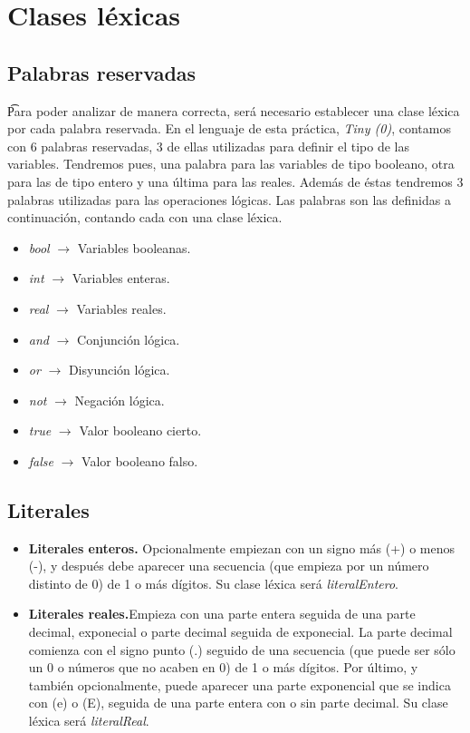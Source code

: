 \section{Clases léxicas}

\subsection{Palabras reservadas}

\t Para poder analizar de manera correcta, será necesario establecer una clase léxica por cada palabra reservada. En el lenguaje de
esta práctica, \textit{Tiny (0)}, contamos con 6 palabras reservadas, 3 de ellas utilizadas para definir el tipo de las variables.
Tendremos pues, una palabra para las variables de tipo booleano, otra para las de tipo entero y una última para las reales. Además
de éstas tendremos 3 palabras utilizadas para las operaciones lógicas. Las palabras son las definidas a continuación, contando cada con
una clase léxica.

\begin{itemize}
    \item \textit{bool} $\rightarrow$ Variables booleanas.
    \item \textit{int} $\rightarrow$ Variables enteras.
    \item \textit{real} $\rightarrow$ Variables reales.
    \item \textit{and} $\rightarrow$ Conjunción lógica.
    \item \textit{or} $\rightarrow$ Disyunción lógica.
    \item \textit{not} $\rightarrow$ Negación lógica.
    \item \textit{true} $\rightarrow$ Valor booleano cierto.
    \item \textit{false} $\rightarrow$ Valor booleano falso.
\end{itemize}

\subsection{Literales}

\begin{itemize}
    \item \textbf{Literales enteros.} Opcionalmente empiezan con un signo más (+) o menos (-), y después debe aparecer una
        secuencia (que empieza por un número distinto de 0) de 1 o más dígitos. Su clase léxica será \textit{literalEntero}.
    \item \textbf{Literales reales.}Empieza con una parte entera seguida de una parte decimal, exponecial o parte decimal seguida de exponecial. La parte decimal comienza con el signo punto (.) seguido de una secuencia (que puede ser sólo un 0 o números que no acaben en 0) de 1 o más dígitos. Por último, y también opcionalmente, puede aparecer una parte exponencial que se indica con (e) o (E), seguida de una parte entera con o sin parte decimal. Su clase léxica será \textit{literalReal}.
\end{itemize}


